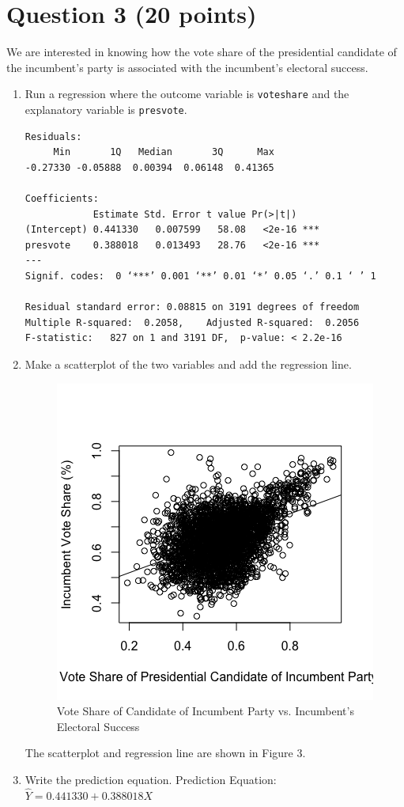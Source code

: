\documentclass[12pt,letterpaper]{article}
\begin{document}
	\newpage	
\section*{Question 3 (20 points)}

\noindent We are interested in knowing how the vote share of the presidential candidate of the incumbent's party is associated with the incumbent's electoral success.
	\vspace{.25cm}
	\begin{enumerate}
		\item Run a regression where the outcome variable is \texttt{voteshare} and the explanatory variable is \texttt{presvote}.
			  
			\begin{verbatim}
Residuals:
     Min       1Q   Median       3Q      Max 
-0.27330 -0.05888  0.00394  0.06148  0.41365 

Coefficients:
            Estimate Std. Error t value Pr(>|t|)    
(Intercept) 0.441330   0.007599   58.08   <2e-16 ***
presvote    0.388018   0.013493   28.76   <2e-16 ***
---
Signif. codes:  0 ‘***’ 0.001 ‘**’ 0.01 ‘*’ 0.05 ‘.’ 0.1 ‘ ’ 1

Residual standard error: 0.08815 on 3191 degrees of freedom
Multiple R-squared:  0.2058,	Adjusted R-squared:  0.2056 
F-statistic:   827 on 1 and 3191 DF,  p-value: < 2.2e-16
			\end{verbatim}
			\vspace{.5cm}
		\item Make a scatterplot of the two variables and add the regression line. 
				  
		\begin{figure}[h!]
			\caption{\footnotesize{Vote Share of Candidate of Incumbent Party vs. Incumbent's Electoral Success}}
			\vspace{.001cm}
			\centering
			\label{fig:graph3}
			\includegraphics[width=.5\textwidth]{./PS3_Graph_3.png}
		\end{figure}
		The scatterplot and regression line are shown in Figure 3.
			\vspace{.5cm}
		\item Write the prediction equation.
		Prediction Equation: ${\hat{Y} = 0.441330 + 0.388018X}$
	\end{enumerate}
	
\end{document}
